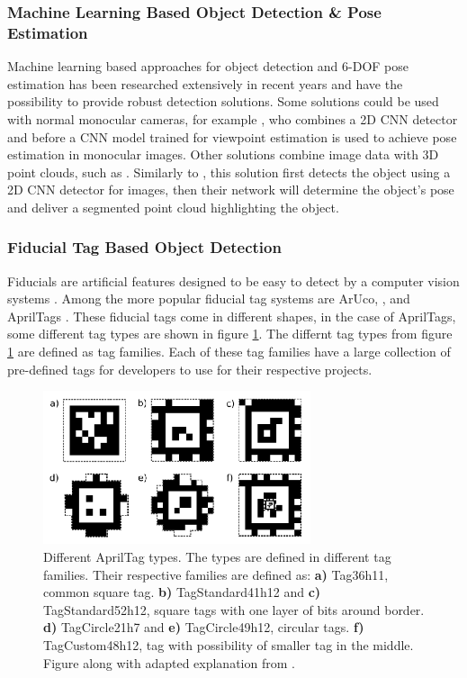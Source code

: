\subsubsection{Machine Learning Based Object Detection \& Pose Estimation}
Machine learning based approaches for object detection and 6-DOF pose estimation has been researched extensively in recent years and have the possibility to provide robust detection solutions. Some solutions could be used with normal monocular cameras, for example \cite{JosipKerzel2018}, who combines a 2D CNN detector and before a CNN model trained for viewpoint estimation is used to achieve pose estimation in monocular images. Other solutions combine image data with 3D point clouds, such as \cite{WeiDuan2020}. Similarly to \cite{JosipKerzel2018}, this solution first detects the object using a 2D CNN detector for images, then their network will determine the object's pose and deliver a segmented point cloud highlighting the object.

\subsubsection{Fiducial Tag Based Object Detection }\label{sec:T:OD:TagBasedObjectDetection}
Fiducials are artificial features designed to be easy to detect by a computer vision systems \cite{krogius2019iros}. Among the more popular fiducial tag systems are ArUco, \cite{JuardoSalinas2016} \cite{RamirezSalinas2018},  and AprilTags \cite{olson2011tags} \cite{wang2016iros} \cite{krogius2019iros}. These fiducial tags come in different shapes, in the case of AprilTags, some different tag types are shown in figure \ref{fig:T:PAP:MV:AprilTag}. The differnt tag types from figure \ref{fig:T:PAP:MV:AprilTag} are defined as tag families. Each of these tag families have a large collection of pre-defined tags for developers to use for their respective projects.

\begin{figure}[htp]
  \centering
  \includegraphics[width = 0.7\textwidth]{Figures/figAprilTag.pdf}
  \caption{Different AprilTag types. The types are defined in different tag families. Their respective families are defined as: \textbf{a)} Tag36h11, common square tag. \textbf{b)} TagStandard41h12 and \textbf{c)} TagStandard52h12, square tags with one layer of bits around border. \textbf{d)} TagCircle21h7 and \textbf{e)} TagCircle49h12, circular tags. \textbf{f)} TagCustom48h12, tag with possibility of smaller tag in the middle. Figure along with adapted explanation from \cite{krogius2019iros}.}
  \label{fig:T:PAP:MV:AprilTag}
\end{figure}




